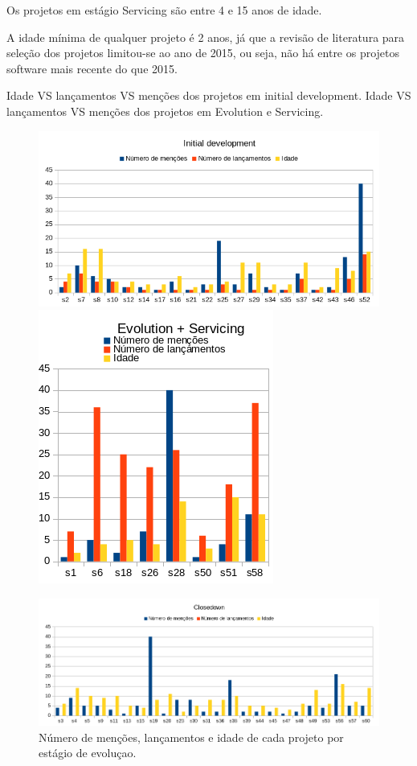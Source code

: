 Os projetos em estágio Servicing são entre 4 e 15 anos de idade.

A idade mínima de qualquer projeto é 2 anos, já que a revisão de literatura
para seleção dos projetos limitou-se ao ano de 2015, ou seja, não há entre
os projetos software mais recente do que 2015.

Idade VS lançamentos VS menções dos projetos em initial development.
Idade VS lançamentos VS menções dos projetos em Evolution e Servicing.

\begin{figure}[h]
  \centering
  \includegraphics[scale=0.6]{imagens/age-initial-development.png}
  \includegraphics[scale=0.6]{imagens/age-evolution-servicing.png}

  \includegraphics[scale=0.6]{imagens/age-closedown.png}
  \caption{Número de menções, lançamentos e idade de cada projeto por estágio de evoluçao.}
  \label{age-vs-stage}
\end{figure}

